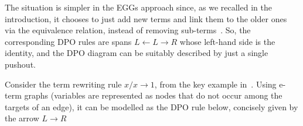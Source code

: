 \documentclass[3p]{elsarticle}
\newcommand{\pbc}{\mathsf{Pb}}
\theoremstyle{remark}
\theoremstyle{definition}
\begin{document}

The situation is simpler in the EGGs approach since, as we recalled in the introduction, it chooses to
just add new terms and link them to the older ones via the equivalence relation,
instead of removing sub-terms~\cite{DetlefsNS05}.
So, the corresponding DPO rules 
are spans $L \leftarrow L \rightarrow R$ whose left-hand side is the identity,
and the DPO diagram can be suitably described by just a single pushout.

Consider the term rewriting rule $x / x \to 1$, from the key example in~\cite{WillseyNWFTP21}.
Using e-term graphs (variables are represented as nodes that do not occur among the targets of an edge),
 it can be modelled as the DPO rule below, concisely given by the arrow $L \rightarrow R$
\end{document}
